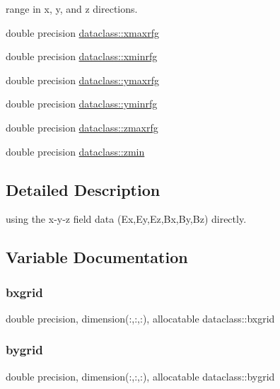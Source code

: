 \label{_amgrp01747264fe7bf50731df0522c351974e}%
range in x, y, and z directions. \begin{DoxyCompactItemize}
\item 
double precision \mbox{\hyperlink{group__name_ga32b5b26da65d1b3507a36c17029a18ae}{dataclass\+::xmaxrfg}}
\item 
double precision \mbox{\hyperlink{group__name_gab5b5b652fce1e93de12accd3514958a0}{dataclass\+::xminrfg}}
\item 
double precision \mbox{\hyperlink{group__name_ga79212aa125148748cc4bd5a11fff492f}{dataclass\+::ymaxrfg}}
\item 
double precision \mbox{\hyperlink{group__name_ga5393ad3032e6f0311c62d03d468a6cf0}{dataclass\+::yminrfg}}
\item 
double precision \mbox{\hyperlink{group__name_ga52b6a1ee39c205fce4ef2be72ab153aa}{dataclass\+::zmaxrfg}}
\item 
double precision \mbox{\hyperlink{group__name_ga9c2398fd87701d5c0de37ff6b3357a0c}{dataclass\+::zmin}}
\end{DoxyCompactItemize}


\subsection{Detailed Description}
using the x-\/y-\/z field data (Ex,Ey,Ez,Bx,By,Bz) directly. 



\subsection{Variable Documentation}
\mbox{\label{group__name_gad10657f6c8e764ba3c355bd0e2c98a01}} 
\subsubsection{\texorpdfstring{bxgrid}{bxgrid}}
{\footnotesize\ttfamily double precision, dimension(\+:,\+:,\+:), allocatable dataclass\+::bxgrid}

\mbox{\label{group__name_gaa12722da71ea440ed769b715936c87a3}} 
\subsubsection{\texorpdfstring{bygrid}{bygrid}}
{\footnotesize\ttfamily double precision, dimension(\+:,\+:,\+:), allocatable dataclass\+::bygrid}

